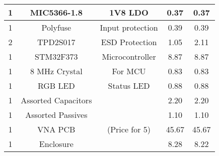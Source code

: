 \begin{table}[h!]
\begin{tabular}{|c|c|c|c|c|}
		1                 & MIC5366-1.8                & 1V8 LDO                  & 0.37                                                                  & 0.37                                                                      \\ \hline
		1                 & Polyfuse                   & Input protection   & 0.39                                                                  & 0.39                                                                      \\ \hline
		2                 & TPD2S017                   & ESD Protection           & 1.05                                                                  & 2.11                                                                      \\ \hline
		1                 & STM32F373              & Microcontroller           & 8.87                                                                 & 8.87                                                                      \\ \hline
		1                 & 8 MHz Crystal              & For MCU                  & 0.83                                                                  & 0.83                                                                      \\ \hline
		1                 & RGB LED                    & Status LED               & 0.88                                                                  & 0.88                                                                      \\ \hline
		1                 & Assorted Capacitors        &                          & 2.20                                                                    & 2.20                                                                        \\ \hline
		1                 & Assorted Passives &                          & 1.10                                                                    & 1.10                                                                        \\ \hline
		1                 & VNA PCB                    & (Price for 5)            & 45.67                                                                 & 45.67                                                                     \\ \hline
		1                 & Enclosure                  &                          & 8.28                                                                  & 8.22                                                                      \\ \hline

\end{tabular}
\end{table}

